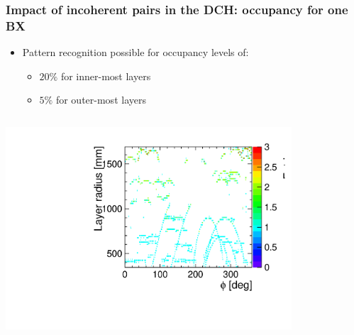 \documentclass[aspectratio=169, hyperref={colorlinks=true,pdfpagelabels=false,linkcolor=black}, xcolor=dvipsnames,10pt]{beamer}
\begin{document}
\begin{frame}
	\frametitle{Impact of incoherent pairs in the DCH: occupancy
          for one BX}

        \begin{itemize}
        \item Pattern recognition possible for occupancy levels of:
          \begin{itemize}
          \item $20\%$ for inner-most layers
          \item $5\%$ for outer-most layers
          \end{itemize}
        \end{itemize}

	\vspace{-0.1cm}
	\begin{columns}[t]
	\centering
	\includegraphics[width=0.8\textwidth]{../figures/layerR_vs_phi.pdf}


	\centering
\end{columns}
\end{frame}
\end{document}
